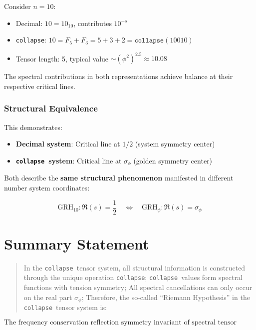 \documentclass[12pt,a4paper]{article}
\theoremstyle{plain}
\theoremstyle{definition}
\theoremstyle{remark}
\newcommand{\collapse}{\texttt{collapse}}
\begin{document}
Consider $n = 10$:
\begin{itemize}
\item Decimal: $10 = 10_{10}$, contributes $10^{-s}$
\item \collapse: $10 = F_5 + F_3 = 5 + 3 + 2 = \collapse(10010)$
\item Tensor length: 5, typical value $\sim (\phi^2)^{2.5} \approx 10.08$
\end{itemize}

The spectral contributions in both representations achieve balance at their respective critical lines.

\subsubsection{Structural Equivalence}

This demonstrates:
\begin{itemize}
\item \textbf{Decimal system}: Critical line at $1/2$ (system symmetry center)
\item \textbf{\collapse\ system}: Critical line at $\sigma_\phi$ (golden symmetry center)
\end{itemize}

Both describe the \textbf{same structural phenomenon} manifested in different number system coordinates:

\begin{equation}
\boxed{
\text{GRH}_{10}: \Re(s) = \frac{1}{2} \quad \Leftrightarrow \quad \text{GRH}_\phi: \Re(s) = \sigma_\phi
}
\end{equation}

\section{Summary Statement}

\begin{quote}
In the \collapse\ tensor system, all structural information is constructed through the unique operation \collapse;
\collapse\ values form spectral functions with tension symmetry;
All spectral cancellations can only occur on the real part $\sigma_\phi$;
Therefore, the so-called ``Riemann Hypothesis'' in the \collapse\ tensor system is:
\end{quote}

\begin{equation}
\boxed{
\text{The frequency conservation reflection symmetry invariant of spectral tensor structure}
}
\end{equation}
\end{document}
